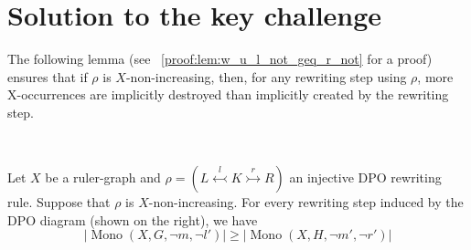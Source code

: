 \section{Solution to the key challenge}
\label{subgraph_counting:sec:solution_to_the_key_challenge}
The following lemma (see \iflongversion
\textsection~\ref{proof:lem:w_u_l_not_geq_r_not}
\else
\cite[Lemma 40]{qiu2025termination}
\fi for a proof) ensures that if $\rho$ is $X$-non-increasing, then, for any rewriting step using $\rho$, 
more X-occurrences are implicitly destroyed than implicitly created by the rewriting step.

\begin{lemma} 
    \label{subgraph_counting:lem:w_u_l_not_geq_r_not}
    \ \newline 
    \noindent 
    \begin{minipage}{0.7\textwidth}
        Let $X$ be a ruler-graph and $\rho = (L \overset{l}{\leftarrowtail} K \overset{r}{\rightarrowtail} R)$ an injective DPO rewriting rule.
        Suppose that $\rho$ is $X$-non-increasing. For every rewriting step induced by the DPO diagram (shown on the right), we have 
        \[
            |\operatorname{Mono}(X, G, \lnot m, \lnot l')| \geq |\operatorname{Mono}(X, H, \lnot m', \lnot r')|
        \]
    \end{minipage}
    \hfill
    \begin{minipage}{0.29\textwidth}
        \hfill
    \end{minipage}
\end{lemma}

